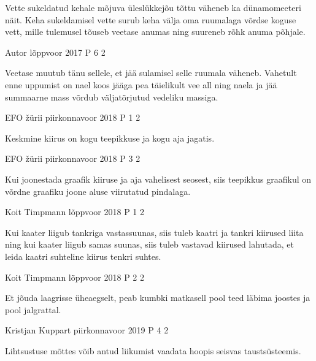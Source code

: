 \documentclass[11pt]{article}
\begin{document}
{{\ifHint
Vette sukeldatud kehale mõjuva üleslükkejõu tõttu väheneb ka dünamomeeteri näit. Keha sukeldamisel vette surub keha välja oma ruumalaga võrdse koguse vett, mille tulemusel tõuseb veetase anumas ning suureneb rõhk anuma põhjale.
\fi
}


{Autor} %
{lõppvoor} %
{2017} %
{P 6} %
{2} %
{

\ifHint
Veetase muutub tänu sellele, et jää sulamisel selle ruumala väheneb. Vahetult enne uppumist on nael koos jääga pea täielikult vee all ning naela ja jää summaarne mass võrdub väljatõrjutud vedeliku massiga.
\fi
}

{EFO žürii} %
{piirkonnavoor} %
{2018} %
{P 1} %
{2} %
{

\ifHint
Keskmine kiirus on kogu teepikkuse ja kogu aja jagatis.
\fi
}


{EFO žürii} %
{piirkonnavoor} %
{2018} %
{P 3} %
{2} %
{

\ifHint
Kui joonestada graafik kiiruse ja aja vahelisest seosest, siis teepikkus graafikul on võrdne graafiku joone aluse viirutatud pindalaga.
\fi
}


{Koit Timpmann} %
{lõppvoor} %
{2018} %
{P 1} %
{2} %
{

\ifHint
Kui kaater liigub tankriga vastassuunas, siis tuleb kaatri ja tankri kiirused liita ning kui kaater liigub samas suunas, siis tuleb vastavad kiirused lahutada, et leida kaatri suhteline kiirus tenkri suhtes.
\fi
}

{Koit Timpmann} %
{lõppvoor} %
{2018} %
{P 2} %
{2} %
{

\ifHint
Et jõuda laagrisse üheaegselt, peab kumbki matkasell pool teed läbima joostes ja pool jalgrattal.
\fi
}

{Kristjan Kuppart} %
{piirkonnavoor} %
{2019} %
{P 4} %
{2} %
{

\ifHint
Lihtsustuse mõttes võib antud liikumist vaadata hoopis seisvas taustsüsteemis.
\fi
}


}
\end{document}
